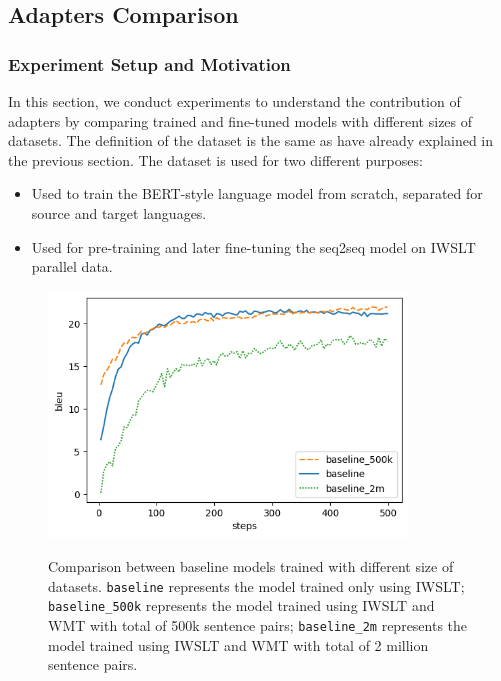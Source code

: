 \subsection{Adapters Comparison}
\label{ssec:adaptcomp}
\subsubsection{Experiment Setup and Motivation}
In this section, we conduct experiments to understand the contribution of adapt\-ers by comparing trained and fine-tuned models with different sizes of datasets. The definition of the dataset is the same as have already explained in the previous section. The dataset is used for two different purposes:
\begin{itemize}
    \item Used to train the BERT-style language model from scratch, separated for source and target languages.
    \item Used for pre-training and later fine-tuning the seq2seq model on IWSLT parallel data.
\end{itemize}

\begin{figure}[t]
    {\includegraphics[width=0.85\textwidth]{img/baseline.png}}
    \centering
    \caption[Comparison between baseline models trained with different size of datasets.]{
        Comparison between baseline models trained with different size of datasets. \texttt{baseline} represents the model trained only using IWSLT; \texttt{baseline\_500k} represents the model trained using IWSLT and WMT with total of 500k sentence pairs; \texttt{baseline\_2m} represents the model trained using IWSLT and WMT with total of 2 million sentence pairs.}
    \label{img:basecomp}
\end{figure}

